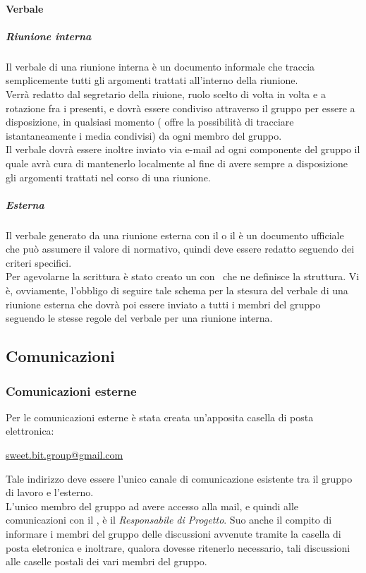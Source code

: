         \paragraph{Verbale}
          \subparagraph{Riunione interna}
            Il verbale di una riunione interna è un documento informale che traccia semplicemente tutti gli argomenti trattati all'interno della riunione.\\
            Verrà redatto dal segretario della riuione, ruolo scelto di volta in volta e a rotazione fra i presenti, e dovrà essere condiviso attraverso il gruppo \textbf{}
            per essere a disposizione, in qualsiasi momento (\textbf{} offre la possibilità di tracciare istantaneamente i media condivisi) da ogni membro del gruppo.\\
            Il verbale dovrà essere inoltre inviato via e-mail ad ogni componente del gruppo il quale avrà cura di mantenerlo localmente al fine di avere sempre a disposizione
            gli argomenti trattati nel corso di una riunione.
          \subparagraph{Esterna}
            Il verbale generato da una riunione esterna con il  o il  è un documento ufficiale che può assumere il valore di normativo, quindi deve essere redatto
            seguendo dei criteri specifici.\\
            Per agevolarne la scrittura è stato creato un  con \glossaryItem{\LaTeX}\ che ne definisce la struttura.
            Vi è, ovviamente, l'obbligo di seguire tale schema per la stesura del verbale di una riunione esterna che dovrà poi essere inviato a tutti i membri del gruppo seguendo
            le stesse regole del verbale per una riunione interna.
    \subsection{Comunicazioni}
      \subsubsection{Comunicazioni esterne}
        Per le comunicazioni esterne è stata creata un'apposita casella di posta elettronica:\\
          \begin{center}
            \href{mailto:sweet.bit.group@gmail.com}{sweet.bit.group@gmail.com}
          \end{center}
        Tale indirizzo deve essere l’unico canale di comunicazione esistente tra il gruppo di lavoro e l’esterno.\\
        L'unico membro del gruppo ad avere accesso alla mail, e quindi alle comunicazioni con il , è il \emph{Responsabile di Progetto}.
        Suo anche il compito di informare i membri del gruppo delle discussioni avvenute tramite la casella di posta eletronica e inoltrare, qualora dovesse ritenerlo necessario,
        tali discussioni alle caselle postali dei vari membri del gruppo.
